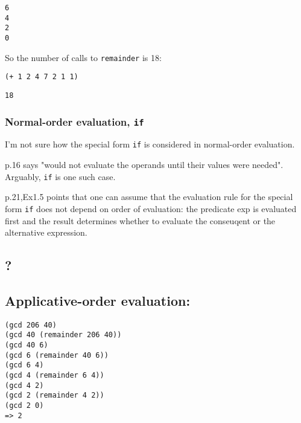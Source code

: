 \documentclass[11pt]{article}
\begin{document}
\begin{verbatim}
6
4
2
0
\end{verbatim}


So the number of calls to \texttt{remainder} is 18:
\begin{verbatim}
(+ 1 2 4 7 2 1 1)
\end{verbatim}

\begin{verbatim}
18
\end{verbatim}

\subsubsection{Normal-order evaluation, \texttt{if}}
\label{sec:org1d8a258}

I'm not sure how the special form \texttt{if} is considered in normal-order evaluation.

p.16 says "would not evaluate the operands until their values were needed". Arguably, \texttt{if} is one such case.

p.21,Ex1.5 points that one can assume that the evaluation rule for the special form \texttt{if} does not depend on order of evaluation: the predicate exp is evaluated first and the result determines whether to evaluate the conseuqent or the alternative expression.

\subsection{?}
\label{sec:orgcb0b3ae}

\subsection{Applicative-order evaluation:}
\label{sec:orga13469e}

\begin{verbatim}
(gcd 206 40)
(gcd 40 (remainder 206 40))
(gcd 40 6)
(gcd 6 (remainder 40 6))
(gcd 6 4)
(gcd 4 (remainder 6 4))
(gcd 4 2)
(gcd 2 (remainder 4 2))
(gcd 2 0)
=> 2
\end{verbatim}
\end{document}
